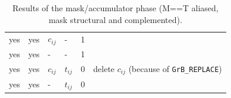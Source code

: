 \begin{table}
{\begin{tabular}{lllll|l}
\hline
    yes&yes & $c_{ij}$ &  -        & 1    &   \\
    yes&yes &  -       &  -        & 1    &   \\
    yes&yes & $c_{ij}$ & $t_{ij}$  & 0    &  delete $c_{ij}$  (because of \verb'GrB_REPLACE') \\
    yes&yes &  -       & $t_{ij}$  & 0    &   \\
\hline
\end{tabular}
}
\caption{Results of the mask/accumulator phase (M==T aliased, mask structural and
complemented). \label{tab:hack3}}
\end{table}

